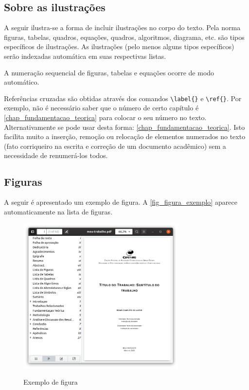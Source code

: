 \begin{apendicesenv}

    \chapter{Sobre as ilustrações}
    \label{chap_sobre_as_ilustracoes}

    A seguir ilustra-se a forma de incluir ilustrações no corpo do texto.
    Pela norma figuras, tabelas, quadros, equações, quadros, algoritmos, diagrama, etc.
    são tipos específicos de ilustrações.
    As ilustrações (pelo menos alguns tipos específicos) serão indexadas automática em suas respectivas listas.

    A numeração sequencial de figuras, tabelas e equações ocorre de modo automático.

    Referências cruzadas são obtidas através dos comandos \verb|\label{}| e \verb|\ref{}|.
    Por exemplo, não é necessário saber que o número de certo capítulo é \ref{chap_fundamentacao_teorica} para colocar o seu número no texto.
    Alternativamente se pode usar desta forma: \autoref{chap_fundamentacao_teorica}.
    Isto facilita muito a inserção, remoção ou relocação de elementos numerados no texto (fato corriqueiro na escrita e correção de um documento acadêmico) sem a necessidade de renumerá-los todos.

    \section{Figuras}
    \label{sec_figuras}

    A seguir é apresentado um exemplo de figura.
    A \autoref{fig_figura_exemplo} aparece automaticamente na lista de figuras.

    \begin{figure}[!htb]
        \centering
        \caption{Exemplo de figura}
        \includegraphics[width=0.75\textwidth]{figuras/figura-exemplo}
        \label{fig_figura_exemplo}
    \end{figure}


\end{apendicesenv}
